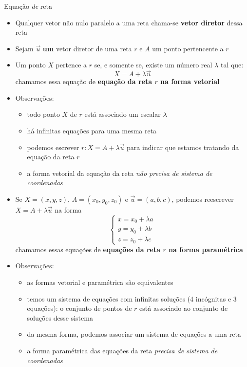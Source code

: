 \begin{frame}{Equação \textit{de} reta}
    \begin{itemize}
        \item Qualquer vetor não nulo paralelo a uma reta chama-se \textbf{vetor diretor}
            dessa reta
        \item Sejam \(\vec{u}\) \textbf{um} vetor diretor de uma reta \(r\) e \(A\)
            um ponto pertencente a \(r\)
        \item Um ponto \(X\) pertence a \(r\) se, e somente se, existe um número real \(\lambda\) tal que:
            \[
                X=A+\lambda \vec{u}
            \]
            chamamos essa equação de \textbf{equação da reta \(r\) na forma vetorial}
        \item Observações:
            \begin{itemize}
                \item todo ponto \(X\) de \(r\) está associado um escalar \(\lambda\)
                \item há infinitas equações para uma mesma reta
                \item podemos escrever \(r: X=A+\lambda \vec{u}\) para indicar que estamos 
                    tratando da equação da reta \(r\)
                \item a forma vetorial da equação da reta \textit{não precisa de sistema de coordenadas}
            \end{itemize}
    \end{itemize}
\end{frame}

\begin{frame}
    \begin{itemize}
        \item Se \(X=(x,y,z)\), \(A=(x_0,y_0,z_0)\) e \(\vec{u}=(a,b,c)\), 
            podemos reescrever \(X=A+\lambda \vec{u}\) na forma
            \[
                \begin{cases}
                    x = x_0 + \lambda a \\
                    y = y_0 + \lambda b \\
                    z = z_0 + \lambda c
                \end{cases}
            \]
        chamamos essas equações de \textbf{equações da reta \(r\) na forma paramétrica}
    \item Observações:
        \begin{itemize}
            \item as formas vetorial e paramétrica são equivalentes
            \item temos um sistema de equações com infinitas soluções (4 incógnitas e 3 equações): 
                o conjunto de pontos de \(r\) está associado ao conjunto de soluções desse sistema
            \item da mesma forma, podemos associar um \alert{sistema de equações} a uma reta
            \item a forma paramétrica das equações da reta \textit{precisa de sistema de coordenadas}
        \end{itemize}
    \end{itemize}
\end{frame}

